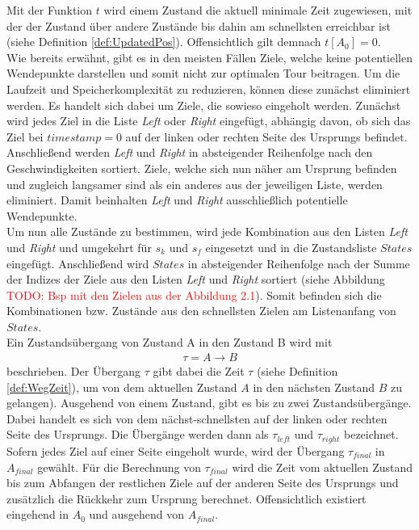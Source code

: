 \documentclass[german,version-2019-11]{uzl-thesis}
\begin{document}
Mit der Funktion $t$ wird einem Zustand die aktuell minimale Zeit zugewiesen, mit der der Zustand über andere Zustände bis dahin am schnellsten erreichbar ist (siehe Definition \ref{def:UpdatedPos}). Offensichtlich gilt demnach $t[A_0] = 0$. \\
Wie bereits erwähnt, gibt es in den meisten Fällen Ziele, welche keine potentiellen Wendepunkte darstellen und somit nicht zur optimalen Tour beitragen. Um die Laufzeit und Speicherkomplexität zu reduzieren, können diese zunächst eliminiert werden. Es handelt sich dabei um Ziele, die sowieso eingeholt werden. Zunächst wird jedes Ziel in die Liste \emph{Left} oder \emph{Right} eingefügt, abhängig davon, ob sich das Ziel bei $timestamp = 0$ auf der linken oder rechten Seite des Ursprungs befindet. Anschließend werden \emph{Left} und \emph{Right} in absteigender Reihenfolge nach den Geschwindigkeiten sortiert. Ziele, welche sich nun näher am Ursprung befinden
und zugleich langsamer sind als ein anderes aus der jeweiligen Liste, werden eliminiert. Damit beinhalten \emph{Left} und \emph{Right} ausschließlich potentielle Wendepunkte. \\
Um nun alle Zustände zu bestimmen, wird jede Kombination aus den Listen \emph{Left} und \emph{Right} und umgekehrt für $s_k$ und $s_f$ eingesetzt und in die Zustandsliste $States$ eingefügt. Anschließend wird $States$ in absteigender Reihenfolge nach der Summe der Indizes der Ziele aus den Listen \emph{Left} und \emph{Right} sortiert (siehe Abbildung \textcolor{red}{TODO: Bsp mit den Zielen aus der Abbildung 2.1}). Somit befinden sich die Kombinationen bzw. Zustände aus den schnellsten Zielen am Listenanfang von $States$.\\
Ein Zustandsübergang von Zustand A in den Zustand B wird mit
\begin{align*}
\tau = A\rightarrow B
\end{align*}
beschrieben. Der Übergang $\tau$ gibt dabei die Zeit $\tau$ (siehe Definition \ref{def:WegZeit}), um von dem aktuellen Zustand $A$ in den nächsten Zustand $B$ zu gelangen). Ausgehend von einem Zustand, gibt es bis zu zwei Zustandsübergänge. Dabei handelt es sich von dem nächst-schnellsten auf der linken oder rechten Seite des Ursprungs. Die Übergänge werden dann als $\tau_{left}$ und $\tau_{right}$ bezeichnet. Sofern jedes Ziel auf einer Seite eingeholt wurde, wird der Übergang $\tau_{final}$ in $A_{final}$ gewählt. Für die Berechnung von $\tau_{final}$ wird die Zeit vom aktuellen Zustand bis zum Abfangen der restlichen Ziele auf der anderen Seite des Ursprungs und zusätzlich die Rückkehr zum Ursprung berechnet. Offensichtlich existiert eingehend in $A_0$ und ausgehend von $A_{final}$. \\
\end{document}
